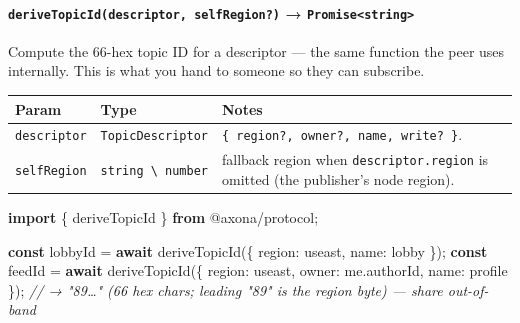 \documentclass[
  nobib]{tufte-handout}
\newenvironment{Shaded}{}{}
\newcommand{\AttributeTok}[1]{\textcolor[rgb]{0.49,0.56,0.16}{#1}}
\newcommand{\CommentTok}[1]{\textcolor[rgb]{0.38,0.63,0.69}{\textit{#1}}}
\newcommand{\ControlFlowTok}[1]{\textcolor[rgb]{0.00,0.44,0.13}{\textbf{#1}}}
\newcommand{\DataTypeTok}[1]{\textcolor[rgb]{0.56,0.13,0.00}{#1}}
\newcommand{\FunctionTok}[1]{\textcolor[rgb]{0.02,0.16,0.49}{#1}}
\newcommand{\ImportTok}[1]{\textcolor[rgb]{0.00,0.50,0.00}{\textbf{#1}}}
\newcommand{\KeywordTok}[1]{\textcolor[rgb]{0.00,0.44,0.13}{\textbf{#1}}}
\newcommand{\NormalTok}[1]{#1}
\newcommand{\OperatorTok}[1]{\textcolor[rgb]{0.40,0.40,0.40}{#1}}
\newcommand{\StringTok}[1]{\textcolor[rgb]{0.25,0.44,0.63}{#1}}
\newcounter{none} %
\begin{document}
\paragraph{\texorpdfstring{\texttt{deriveTopicId(descriptor,\ selfRegion?)}
→
\texttt{Promise\textless{}string\textgreater{}}}{deriveTopicId(descriptor, selfRegion?) → Promise\textless string\textgreater{}}}\label{derivetopiciddescriptor-selfregion-promisestring}

Compute the 66-hex topic ID for a descriptor --- the same function the
peer uses internally. This is what you hand to someone so they can
subscribe.

{\def\LTcaptype{none} %
\begin{longtable}[]{@{}
  >{\raggedright\arraybackslash}p{}
  >{\raggedright\arraybackslash}p{}
  >{\raggedright\arraybackslash}p{}@{}}
\toprule\noalign{}
\begin{minipage}[b]{\linewidth}\raggedright
Param
\end{minipage} & \begin{minipage}[b]{\linewidth}\raggedright
Type
\end{minipage} & \begin{minipage}[b]{\linewidth}\raggedright
Notes
\end{minipage} \\
\midrule\noalign{}
\endhead
\bottomrule\noalign{}
\endlastfoot
\texttt{descriptor} & \texttt{TopicDescriptor} &
\texttt{\{\ region?,\ owner?,\ name,\ write?\ \}}. \\
\texttt{selfRegion} &
\texttt{string\ \textbackslash{}\textbar{}\ number} & fallback region
when \texttt{descriptor.region} is omitted (the publisher's node
region). \\
\end{longtable}
}

\begin{Shaded}
\begin{Highlighting}[]
\ImportTok{import}\NormalTok{ \{ deriveTopicId \} }\ImportTok{from} \StringTok{\textquotesingle{}@axona/protocol\textquotesingle{}}\OperatorTok{;}

\KeywordTok{const}\NormalTok{ lobbyId }\OperatorTok{=} \ControlFlowTok{await} \FunctionTok{deriveTopicId}\NormalTok{(\{ }\DataTypeTok{region}\OperatorTok{:} \StringTok{\textquotesingle{}useast\textquotesingle{}}\OperatorTok{,} \DataTypeTok{name}\OperatorTok{:} \StringTok{\textquotesingle{}lobby\textquotesingle{}}\NormalTok{ \})}\OperatorTok{;}
\KeywordTok{const}\NormalTok{ feedId  }\OperatorTok{=} \ControlFlowTok{await} \FunctionTok{deriveTopicId}\NormalTok{(\{ }\DataTypeTok{region}\OperatorTok{:} \StringTok{\textquotesingle{}useast\textquotesingle{}}\OperatorTok{,} \DataTypeTok{owner}\OperatorTok{:}\NormalTok{ me}\OperatorTok{.}\AttributeTok{authorId}\OperatorTok{,} \DataTypeTok{name}\OperatorTok{:} \StringTok{\textquotesingle{}profile\textquotesingle{}}\NormalTok{ \})}\OperatorTok{;}
\CommentTok{// → "89…"  (66 hex chars; leading "89" is the region byte) — share out{-}of{-}band}
\end{Highlighting}
\end{Shaded}
\end{document}
